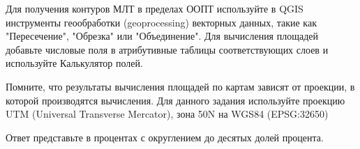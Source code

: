 Для получения контуров МЛТ в пределах ООПТ используйте в QGIS  инструменты геообработки (geoprocessing) векторных данных, такие как "Пересечение", "Обрезка" или "Объединение". Для вычисления площадей добавьте числовые поля в атрибутивные таблицы соответствующих слоев и используйте Калькулятор полей.

Помните, что результаты вычисления площадей по картам зависят от проекции, в которой производятся вычисления. Для данного задания используйте проекцию UTM (Universal Transverse Mercator), зона 50N на WGS84 (EPSG:32650)

Ответ представьте в процентах с округлением до десятых долей процента.